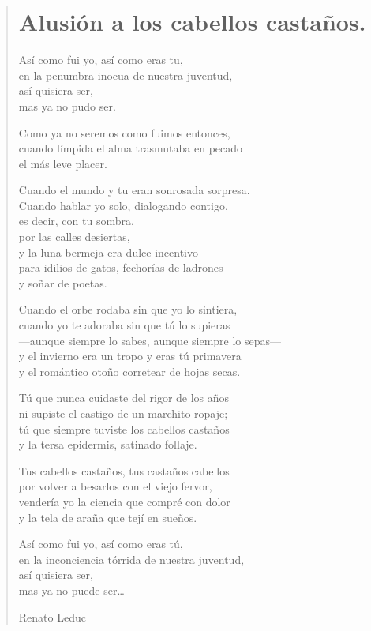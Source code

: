 \documentclass[12pt, twoside]{book}
\begin{document}
\begin{verse}
\begin{center}
\section{Alusión a los cabellos castaños.}
\end{center}
Así como fui yo, así como eras tu,\\
en la penumbra inocua de nuestra juventud,\\
así quisiera ser,\\
mas ya no pudo ser.\newline

Como ya no seremos como fuimos entonces,\\
cuando límpida el alma trasmutaba en pecado\\
el más leve placer.\newline

Cuando el mundo y tu eran sonrosada sorpresa.\\
Cuando hablar yo solo, dialogando contigo,\\
es decir, con tu sombra,\\
por las calles desiertas,\\
y la luna bermeja era dulce incentivo\\
para idilios de gatos, fechorías de ladrones\\
y soñar de poetas.\newline

Cuando el orbe rodaba sin que yo lo sintiera,\\
cuando yo te adoraba sin que tú lo supieras\\
—aunque siempre lo sabes, aunque siempre lo sepas—\\
y el invierno era un tropo y eras tú primavera\\
y el romántico otoño corretear de hojas secas.\newline

Tú que nunca cuidaste del rigor de los años\\
ni supiste el castigo de un marchito ropaje;\\
tú que siempre tuviste los cabellos castaños\\
y la tersa epidermis, satinado follaje.\newpage

Tus cabellos castaños, tus castaños cabellos\\
por volver a besarlos con el viejo fervor,\\
vendería yo la ciencia que compré con dolor\\
y la tela de araña que tejí en sueños.\newline

Así como fui yo, así como eras tú,\\
en la inconciencia tórrida de nuestra juventud,\\
así quisiera ser,\\
mas ya no puede ser…\newline

Renato Leduc
\end{verse}
\newpage
\end{document}
